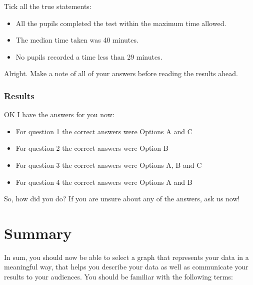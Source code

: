 \documentclass[]{book}
\providecommand{\tightlist}{%
  \setlength{\itemsep}{0pt}\setlength{\parskip}{0pt}}
\theoremstyle{definition}
\theoremstyle{definition}
\theoremstyle{definition}
\theoremstyle{remark}
\begin{document}
Tick all the true statements:

\begin{itemize}
\tightlist
\item
  All the pupils completed the test within the maximum time allowed.
\item
  The median time taken was 40 minutes.
\item
  No pupils recorded a time less than 29 minutes.
\end{itemize}

Alright. Make a note of all of your answers before reading the results
ahead.

\hypertarget{results}{%
\subsubsection*{Results}\label{results}}

OK I have the answers for you now:

\begin{itemize}
\tightlist
\item
  For question 1 the correct answers were Options A and C
\item
  For question 2 the correct answers were Option B
\item
  For question 3 the correct answers were Options A, B and C
\item
  For question 4 the correct answers were Options A and B
\end{itemize}

So, how did you do? If you are unsure about any of the answers, ask us
now!

\hypertarget{summary-5}{%
\section{Summary}\label{summary-5}}

In sum, you should now be able to select a graph that represents your
data in a meaningful way, that helps you describe your data as well as
communicate your results to your audiences. You should be familiar with
the following terms:
\end{document}
